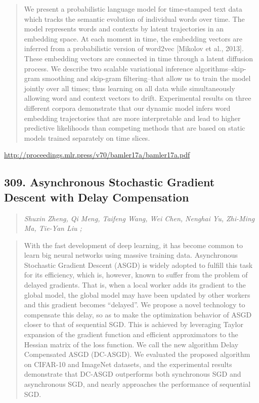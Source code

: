\documentclass{article}
\begin{document}
\begin{quote}
    We present a probabilistic language model for time-stamped text data which tracks the semantic evolution of individual words over time. The model represents words and contexts by latent trajectories in an embedding space. At each moment in time, the embedding vectors are inferred from a probabilistic version of word2vec [Mikolov et al., 2013]. These embedding vectors are connected in time through a latent diffusion process. We describe two scalable variational inference algorithms–skip-gram smoothing and skip-gram filtering–that allow us to train the model jointly over all times; thus learning on all data while simultaneously allowing word and context vectors to drift. Experimental results on three different corpora demonstrate that our dynamic model infers word embedding trajectories that are more interpretable and lead to higher predictive likelihoods than competing methods that are based on static models trained separately on time slices.  \end{quote}

\href{http://proceedings.mlr.press/v70/bamler17a/bamler17a.pdf}{http://proceedings.mlr.press/v70/bamler17a/bamler17a.pdf}

\subsection{309. Asynchronous Stochastic Gradient Descent with Delay Compensation}

\begin{quote}
\footnotesize{\textit{Shuxin Zheng, Qi Meng, Taifeng Wang, Wei Chen, Nenghai Yu, Zhi-Ming Ma, Tie-Yan Liu ;}}
\end{quote}

\begin{quote}
    With the fast development of deep learning, it has become common to learn big neural networks using massive training data. Asynchronous Stochastic Gradient Descent (ASGD) is widely adopted to fulfill this task for its efficiency, which is, however, known to suffer from the problem of delayed gradients. That is, when a local worker adds its gradient to the global model, the global model may have been updated by other workers and this gradient becomes “delayed”. We propose a novel technology to compensate this delay, so as to make the optimization behavior of ASGD closer to that of sequential SGD. This is achieved by leveraging Taylor expansion of the gradient function and efficient approximators to the Hessian matrix of the loss function. We call the new algorithm Delay Compensated ASGD (DC-ASGD). We evaluated the proposed algorithm on CIFAR-10 and ImageNet datasets, and the experimental results demonstrate that DC-ASGD outperforms both synchronous SGD and asynchronous SGD, and nearly approaches the performance of sequential SGD.  \end{quote}
\end{document}
